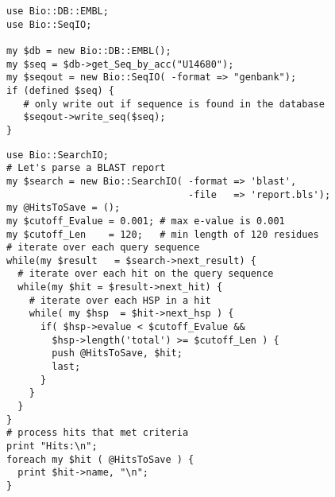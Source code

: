 \documentclass[12pt]{article}
\begin{document}
%
%

\newpage

\begin{verbatim}
use Bio::DB::EMBL;
use Bio::SeqIO;

my $db = new Bio::DB::EMBL();
my $seq = $db->get_Seq_by_acc("U14680");
my $seqout = new Bio::SeqIO( -format => "genbank");
if (defined $seq) { 
   # only write out if sequence is found in the database
   $seqout->write_seq($seq);
}
\end{verbatim}

\newpage

\begin{verbatim}
use Bio::SearchIO;
# Let's parse a BLAST report 
my $search = new Bio::SearchIO( -format => 'blast',
                                -file   => 'report.bls');
my @HitsToSave = ();
my $cutoff_Evalue = 0.001; # max e-value is 0.001
my $cutoff_Len    = 120;   # min length of 120 residues
# iterate over each query sequence
while(my $result   = $search->next_result) {
  # iterate over each hit on the query sequence
  while(my $hit = $result->next_hit) {
    # iterate over each HSP in a hit
    while( my $hsp  = $hit->next_hsp ) {
      if( $hsp->evalue < $cutoff_Evalue && 
        $hsp->length('total') >= $cutoff_Len ) { 
        push @HitsToSave, $hit;
        last;
      } 
    }
  }
}
# process hits that met criteria
print "Hits:\n";
foreach my $hit ( @HitsToSave ) {
  print $hit->name, "\n";	
}

\end{verbatim}
\end{document}
